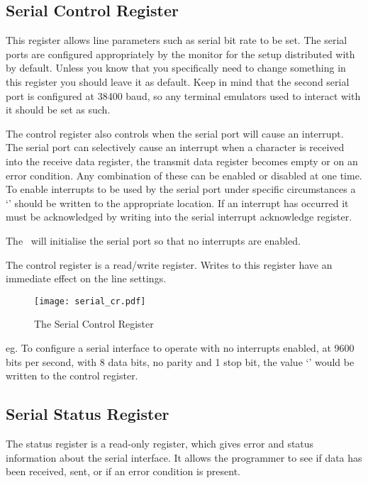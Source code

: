 \newpage
\subsection{Serial Control Register}

This register allows line parameters such as serial bit rate to be
set. The serial ports are configured appropriately by the monitor for
the setup distributed with  by default. Unless you know
that you specifically need to change something in this register you
should leave it as default. Keep in mind that the second serial port
is configured at 38400 baud, so any terminal emulators used to interact
with it should be set as such.

The control register also controls when the serial port will cause an
interrupt. The serial port can selectively cause an interrupt when a
character is received into the receive data register, the transmit
data register becomes empty or on an error condition. Any combination of
these can be enabled or disabled at one time. To enable interrupts to
be used by the serial port under specific circumstances a `'
should be written to the appropriate location. If an interrupt has
occurred it must be acknowledged by writing into the serial interrupt
acknowledge register.

The \WRAMPmon\ will initialise the serial port so that no
interrupts are enabled.

The control register is a read/write register. Writes to this register
have an immediate effect on the line settings.

\begin{figure}[h]
\begin{center}
\texttt{[image: serial\_cr.pdf]}
\caption{The Serial Control Register}
\label{serial_cr_pic}
\end{center}
\end{figure}

\noindent
eg. To configure a serial interface to operate with no interrupts
enabled, at 9600 bits per second, with 8 data bits, no parity and 1
stop bit, the value `' would be written to the
control register.

\subsection{Serial Status Register}

The status register is a read-only register, which gives error and
status information about the serial interface. It allows the
programmer to see if data has been received, sent, or if an error
condition is present.

